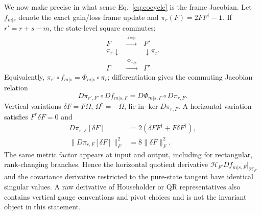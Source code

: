 \documentclass[aps,prx,twocolumn,superscriptaddress,longbibliography,nofootinbib,floatfix]{revtex4-2}
\newcommand{\Id}{\mathbf{1}}
\begin{document}
We now make precise in what sense Eq.~\eqref{eq:cocycle} is the frame Jacobian.  Let
$f_{m|s}$ denote the exact gain/loss frame update and
$\pi_r(F)=2FF^\dagger-\Id$.  If $r'=r+s-m$, the state-level square commutes:
\begin{equation}
 \begin{array}{ccc}
 F&\xrightarrow{\ f_{m|s}\ }&F'\\[-1mm]
 {\scriptstyle\pi_r}\downarrow&&\downarrow{\scriptstyle\pi_{r'}}\\[-1mm]
 \Gamma&\xrightarrow{\ \Phi_{m|s}\ }&\Gamma'
 \end{array}
 \label{eq:state-square}
\end{equation}
Equivalently, $\pi_{r'}\circ f_{m|s}=\Phi_{m|s}\circ\pi_r$; differentiation gives the
commuting Jacobian relation
\begin{equation}
 D\pi_{r',F'}\circ Df_{m|s,F}
 =D\Phi_{m|s,\Gamma}\circ D\pi_{r,F}.
 \label{eq:commuting}
\end{equation}
Vertical variations $\delta F=F\Omega$, $\Omega^\dagger=-\Omega$, lie in
$\ker D\pi_{r,F}$.  A horizontal variation satisfies $F^\dagger\delta F=0$ and
\begin{align}
 D\pi_{r,F}[\delta F]
 &=2(\delta F F^\dagger+F\delta F^\dagger),\nonumber\\
 \|D\pi_{r,F}[\delta F]\|_F^2&=8\|\delta F\|_F^2.
 \label{eq:isometry}
\end{align}
The same metric factor appears at input and output, including for rectangular,
rank-changing branches.  Hence the horizontal quotient derivative
$\mathcal H_{F'}Df_{m|s,F}|_{\mathcal H_F}$ and the covariance derivative restricted to
the pure-state tangent have identical singular values.  A raw derivative of Householder
or QR representatives also contains vertical gauge conventions and pivot choices and is
not the invariant object in this statement.
\end{document}
